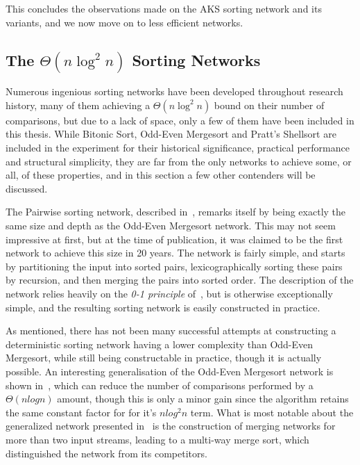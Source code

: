 This concludes the observations made on the AKS sorting network and its variants, and we now move on to less efficient networks.

\subsection{The $\Theta(n \log^2 n)$ Sorting Networks}

Numerous ingenious sorting networks have been developed throughout research history, many of them achieving a $\Theta(n \log^2 n)$ bound on their number of comparisons, but due to a lack of space, only a few of them have been included in this thesis.
While Bitonic Sort, Odd-Even Mergesort and Pratt's Shellsort are included in the experiment for their historical significance, practical performance and structural simplicity, they are far from the only networks to achieve some, or all, of these properties, and in this section a few other contenders will be discussed.

The Pairwise sorting network, described in~, remarks itself by being exactly the same size and depth as the Odd-Even Mergesort network. This may not seem impressive at first, but at the time of publication, it was claimed to be the first network to achieve this size in 20 years. The network is fairly simple, and starts by partitioning the input into sorted pairs, lexicographically sorting these pairs by recursion, and then merging the pairs into sorted order. The description of the network relies heavily on the \emph{0-1 principle} of~, but is otherwise exceptionally simple, and the resulting sorting network is easily constructed in practice.

As mentioned, there has not been many successful attempts at constructing a deterministic sorting network having a lower complexity than Odd-Even Mergesort, while still being constructable in practice, though it is actually possible. An interesting generalisation of the Odd-Even Mergesort network is shown in~, which can reduce the number of comparisons performed by a $\Theta(n log n)$ amount, though this is only a minor gain since the algorithm retains the same constant factor for for it's $n log^2 n$ term. What is most notable about the generalized network presented in~ is the construction of merging networks for more than two input streams, leading to a multi-way merge sort, which distinguished the network from its competitors. 

